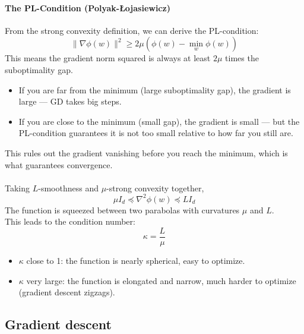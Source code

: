 \documentclass[../Probability.tex]{subfiles}
\begin{document}
\paragraph{The PL-Condition (Polyak-Łojasiewicz)}
From the strong convexity definition, we can derive the PL-condition:
$$\|\nabla\phi(w)\|^2 \geq 2\mu\left(\phi(w) - \min_w \phi(w)\right)$$
This means the gradient norm squared is always at least $2\mu$ times the suboptimality gap.
\begin{itemize}
    \item If you are far from the minimum (large suboptimality gap), the gradient is large — GD takes big steps.
    \item If you are close to the minimum (small gap), the gradient is small — but the PL-condition guarantees it is not too small relative to how far you still are.
\end{itemize}
This rules out the gradient vanishing before you reach the minimum, which is what guarantees convergence.\\
\\
Taking $L$-smoothness and $\mu$-strong convexity together,
$$\mu I_d \preceq \nabla^2 \phi(w) \preceq LI_d$$
The function is squeezed between two parabolas with curvatures $\mu$ and $L$.\\
This leads to the condition number:
$$\kappa = \frac{L}{\mu}$$
\begin{itemize}
    \item $\kappa$ close to 1: the function is nearly spherical, easy to optimize.
    \item $\kappa$ very large: the function is elongated and narrow, much harder to optimize (gradient descent zigzags).
\end{itemize}

\subsection{Gradient descent}
\end{document}
